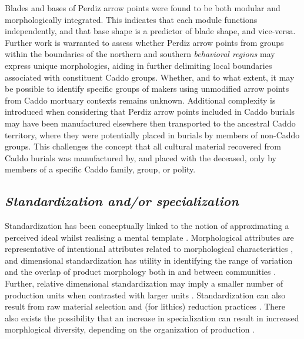 \documentclass[smallextended]{svjour3}       %
\begin{document}
Blades and bases of Perdiz arrow points were found to be both modular
and morphologically integrated. This indicates that each module
functions independently, and that base shape is a predictor of blade
shape, and vice-versa. Further work is warranted to assess whether
Perdiz arrow points from groups within the boundaries of the northern
and southern \emph{behavioral regions} may express unique morphologies,
aiding in further delimiting local boundaries associated with
constituent Caddo groups. Whether, and to what extent, it may be
possible to identify specific groups of makers using unmodified arrow
points from Caddo mortuary contexts remains unknown. Additional
complexity is introduced when considering that Perdiz arrow points
included in Caddo burials may have been manufactured elsewhere then
transported to the ancestral Caddo territory, where they were
potentially placed in burials by members of non-Caddo groups. This
challenges the concept that all cultural material recovered from Caddo
burials was manufactured by, and placed with the deceased, only by
members of a specific Caddo family, group, or polity.

\hypertarget{standardization-andor-specialization}{%
\subsection{\texorpdfstring{\emph{Standardization and/or
specialization}}{Standardization and/or specialization}}\label{standardization-andor-specialization}}

Standardization has been conceptually linked to the notion of
approximating a perceived ideal whilst realising a mental template
\cite[156]{RN9715}. Morphological attributes are representative of
intentional attributes related to morphological characteristics
\cite{RN7051}, and dimensional standardization has utility in
identifying the range of variation and the overlap of product morphology
both in and between communities \cite{RN5779}. Further, relative
dimensional standardization may imply a smaller number of production
units when contrasted with larger units \cite{RN7051}. Standardization
can also result from raw material selection and (for lithics) reduction
practices \cite{RN9712,RN9713,RN6494,RN9714}. There also exists the
possibility that an increase in specialization can result in increased
morphlogical diversity, depending on the organization of production
\cite{RN6451}.
\end{document}
